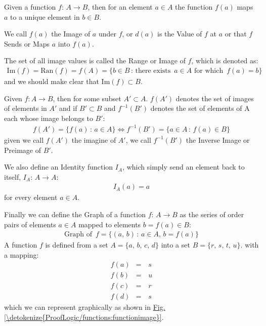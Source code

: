 \documentclass[letterpaper,10pt,english]{jupyterBook}
\begin{document}
\sphinxAtStartPar
Given a function \(f:\, A \rightarrow B\), then for an element \(a \in A\) the function \(f(a)\) maps \(a\) to a unique element in \(b \in B\).

\sphinxAtStartPar
We call \(f(a)\) the Image of \(a\) under \(f\), or \(d(a)\) is the Value of \(f\) at \(a\) or that \(f\) Sends or Maps \(a\) into \(f(a)\).

\sphinxAtStartPar
The set of all image values is called the Range or Image of \(f\), which is denoted as:
\begin{equation*}
\begin{split} \text{Im}(f) = \text{Ran}(f) = f(A) = \{b \in B\,:\, \text{there exists }\, a \in A \,\,\text{for which }\, f(a) = b\}\end{split}
\end{equation*}
\sphinxAtStartPar
and we should make clear that \(\text{Im}(f) \subset B\).

\sphinxAtStartPar
Given \(f: A \rightarrow B\), then for some subset \(A' \subset A\). \(f(A')\) denotes the set of images of elements in \(A'\) and if \(B' \subset B\) and \(f^{-1}(B')\)
denotes the set of elements of A each whose image belongs to \(B'\):
\begin{equation*}
\begin{split} f(A') = \{f(a)\,:\,a \in A\} \Longleftrightarrow f^{-1}(B') = \{a\in A\,:\,f(a)\in B\}\end{split}
\end{equation*}
\sphinxAtStartPar
given we call \(f(A')\) the imagine of \(A'\), we call \(f^{-1}(B')\) the Inverse Image or Preimage of \(B'\).

\sphinxAtStartPar
We also define an Identity function \(I_A\), which simply send an element back to itself, \(I_A:\,A \rightarrow A\):
\begin{equation*}
\begin{split}I_A(a) = a\end{split}
\end{equation*}
\sphinxAtStartPar
for every element \(a \in A\).

\sphinxAtStartPar
Finally we can define the Graph of a function \(f:\,A \rightarrow B\) as the series of order pairs of elements \(a \in A\) mapped to elements \(b = f(a) \in B\):
\begin{equation*}
\begin{split}\text{Graph of }\,f = \{(a,\,b)\,:\, a \in A,\,b = f(a)\}\end{split}
\end{equation*}
\sphinxAtStartPar
A function \(f\) is defined from a set \(A = \{a,\,b,\,c,\,d\}\) into a set \(B = \{r,\,s,\,t,\,u\}\). with a mapping:
\begin{equation*}
\begin{split}f(a) &=&\, s \\
f(b) &=&\, u \\
f(c) &=&\, r \\
f(d) &=&\, s\end{split}
\end{equation*}
\sphinxAtStartPar
which we can represent graphically as shown in \hyperref[\detokenize{ProofLogic/functions:functionimage}]{Fig.\@ \ref{\detokenize{ProofLogic/functions:functionimage}}}.
\end{document}
